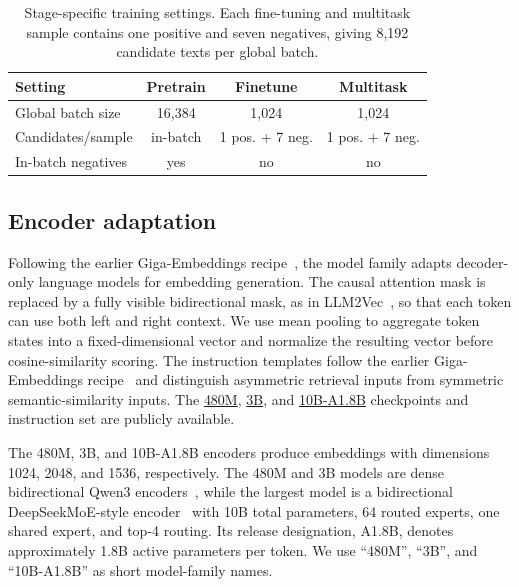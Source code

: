\documentclass{article}
\begin{document}
\begin{table}[!t]
  \caption{Stage-specific training settings. Each fine-tuning and multitask sample contains one positive and seven negatives, giving 8,192 candidate texts per global batch.}
  \label{tab:training}
  \centering
  \footnotesize
  \setlength{\tabcolsep}{3pt}
  \begin{tabular}{lccc}
    \toprule
    \textbf{Setting} & \textbf{Pretrain} & \textbf{Finetune} & \textbf{Multitask} \\
    \midrule
    Global batch size       & 16,384 & 1,024 & 1,024 \\
    Candidates/sample       & in-batch & 1 pos. + 7 neg. & 1 pos. + 7 neg. \\
    In-batch negatives      & yes & no & no \\
    \bottomrule
  \end{tabular}
\end{table}

\subsection{Encoder adaptation}

Following the earlier Giga-Embeddings recipe~\citep{kolodin2025gigaembeddings}, the model family adapts decoder-only language models for embedding generation.
The causal attention mask is replaced by a fully visible bidirectional mask, as in LLM2Vec~\citep{behnamghader2024llm2vec}, so that each token can use both left and right context.
We use mean pooling to aggregate token states into a fixed-dimensional vector and normalize the resulting vector before cosine-similarity scoring.
The instruction templates follow the earlier Giga-Embeddings recipe~\citep{kolodin2025gigaembeddings} and distinguish asymmetric retrieval inputs from symmetric semantic-similarity inputs.
The \href{https://huggingface.co/ai-sage/Giga-Embeddings-instruct-480M-0826}{480M}, \href{https://huggingface.co/ai-sage/Giga-Embeddings-instruct-3B-0826}{3B}, and \href{https://huggingface.co/ai-sage/Giga-Embeddings-instruct-10B-A1.8B-0826}{10B-A1.8B} checkpoints and instruction set are publicly available.

The 480M, 3B, and 10B-A1.8B encoders produce embeddings with dimensions 1024, 2048, and 1536, respectively.
The 480M and 3B models are dense bidirectional Qwen3 encoders~\citep{zhang2025qwen3embedding}, while the largest model is a bidirectional DeepSeekMoE-style encoder~\citep{dai2024deepseekmoe} with 10B total parameters, 64 routed experts, one shared expert, and top-4 routing.
Its release designation, A1.8B, denotes approximately 1.8B active parameters per token.
We use ``480M'', ``3B'', and ``10B-A1.8B'' as short model-family names.
\end{document}

